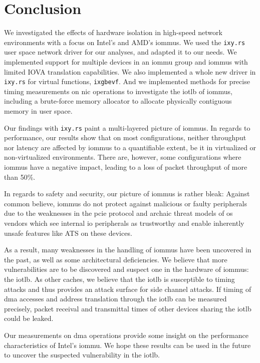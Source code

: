 \chapter{Conclusion}
\label{chap:conclusion}

We investigated the effects of hardware isolation in high-speed network
environments with a focus on Intel's and AMD's \acp{iommu}. We used the
\texttt{ixy.rs} user space network driver for our analyses, and adapted it to
our needs. We implemented support for multiple devices in an \ac{iommu} group
and \acp{iommu} with limited IOVA translation capabilities. We also implemented
a whole new driver in \texttt{ixy.rs} for virtual functions, \texttt{ixgbevf}.
And we implemented methods for precise timing measurements on \ac{nic}
operations to investigate the \ac{iotlb} of \acp{iommu}, including a brute-force
memory allocator to allocate physically contiguous memory in user space.

Our findings with \texttt{ixy.rs} paint a multi-layered picture of \acp{iommu}.
In regards to performance, our results show that on most configurations, neither
throughput nor latency are affected by \acp{iommu} to a quantifiable extent, be
it in virtualized or non-virtualized environments. There are, however, some
configurations where \acp{iommu} have a negative impact, leading to a loss of
packet throughput of more than 50\%.

In regards to safety and security, our picture of \acp{iommu} is rather bleak:
Against common believe, \acp{iommu} do not protect against malicious or faulty
peripherals due to the weaknesses in the \ac{pcie} protocol and archaic threat
models of \ac{os} vendors which see internal \ac{io} peripherals as trustworthy
and enable inherently unsafe features like ATS on these devices.

As a result, many weaknesses in the handling of \acp{iommu} have been uncovered
in the past, as well as some architectural deficiencies. We believe that more
vulnerabilities are to be discovered and suspect one in the hardware of
\acp{iommu}: the \ac{iotlb}. As other caches, we believe that the \ac{iotlb} is
susceptible to timing attacks and thus provides an attack surface for side
channel attacks. If timing of \ac{dma} accesses and address translation through
the \ac{iotlb} can be measured precisely, packet receival and transmittal times
of other devices sharing the \ac{iotlb} could be leaked.

Our measurements on \ac{dma} operations provide some insight on the performance
characteristics of Intel's \ac{iommu}. We hope these results can be used in the
future to uncover the suspected vulnerability in the \ac{iotlb}.

